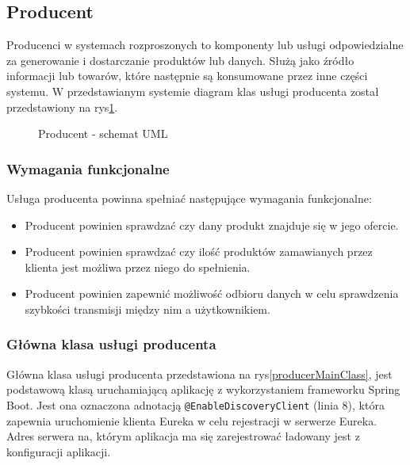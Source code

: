 \subsection{Producent}

Producenci w systemach rozproszonych to komponenty lub usługi odpowiedzialne za generowanie i dostarczanie produktów lub danych. Służą jako źródło informacji lub towarów, które następnie są konsumowane przez inne części systemu. W przedstawianym systemie diagram klas usługi producenta został przedstawiony na rys\ref{ProducerUML}.

\begin{figure}[!htbp]
    \centering
    
    \caption{Producent - schemat UML}
    \label{ProducerUML}
\end{figure}

\subsubsection{Wymagania funkcjonalne}

Usługa producenta powinna spełniać następujące wymagania funkcjonalne:

\begin{itemize}
    \item Producent powinien sprawdzać czy dany produkt znajduje się w jego ofercie.
    \item Producent powinien sprawdzać czy ilość produktów zamawianych przez klienta jest możliwa przez niego do spełnienia. 
    \item Producent powinien zapewnić możliwość odbioru danych w celu sprawdzenia szybkości transmisji między nim a użytkownikiem.
\end{itemize}


\subsubsection{Główna klasa usługi producenta}

Główna klasa usługi producenta przedstawiona na rys\ref{producerMainClass}, jest podstawową klasą uruchamiającą aplikację z wykorzystaniem frameworku Spring Boot. Jest ona oznaczona adnotacją \verb|@EnableDiscoveryClient| (linia 8), która zapewnia uruchomienie klienta Eureka w celu rejestracji w serwerze Eureka. Adres serwera na, którym aplikacja ma się zarejestrować ładowany jest z konfiguracji aplikacji.

